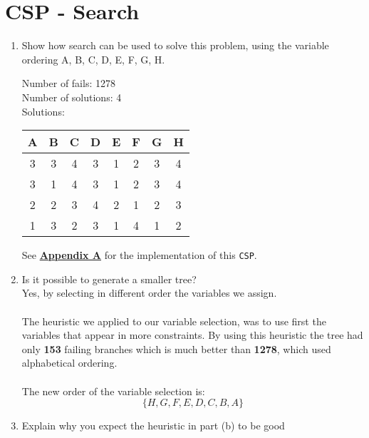 \documentclass{article}
\def\ans#1{{\color{ans}#1}}
\begin{document}
\clearpage
\section{CSP - Search}
\begin{enumerate}[label=(\alph*)]
    \item Show how search can be used to solve this problem, using the variable ordering A, B, C, D, E, F, G, H. \\ 
    \ans{
        Number of fails: 1278 \\
        Number of solutions: 4 \\
        Solutions:
        \begin{center}
        \begin{tabular}{|c|c|c|c|c|c|c|c|}
            \hline
            {A} & {B} & {C} & {D} & {E} & {F} & {G} & {H} \\
            \hline
            \hline
            3 & 3 & 4 & 3 & 1 & 2 & 3 & 4 \\
            \hline
            3 & 1 & 4 & 3 & 1 & 2 & 3 & 4 \\
            \hline
            2 & 2 & 3 & 4 & 2 & 1 & 2 & 3 \\
            \hline
            1 & 3 & 2 & 3 & 1 & 4 & 1 & 2 \\
            \hline
        \end{tabular}
        \end{center}
    }
    \ans{
        See \hyperref[appendix:CSP Search]{\textbf{Appendix A}} for the implementation of this \texttt{CSP}.\\
    }
    \item Is it  possible  to  generate a  smaller  tree? \\
    \ans{
        Yes, by selecting in different order the variables we assign. \\ \\
        The heuristic we applied to our variable selection, was to use first the variables that appear in 
        more constraints. By using this heuristic the tree had only \textbf{153} failing branches which is 
        much better than \textbf{1278}, which used alphabetical ordering. \\ \\
        The new order of the variable selection is: \\
        \[
            \{H, G, F, E, D, C, B, A\}
        \]
    }
    \item Explain why you expect the heuristic in part (b) to be good \\

\end{enumerate}
\end{document}
